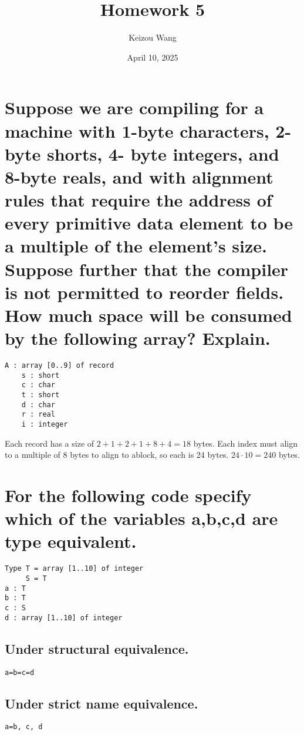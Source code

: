\documentclass[letterpaper]{article}
\title{Homework 5}
\author{Keizou Wang}
\date{April 10, 2025}
\begin{document}
\maketitle

\section{Suppose we are compiling for a machine with 1-byte characters, 2-byte shorts, 4- byte integers, and 8-byte reals, and with alignment rules that require the address of every primitive data element to be a multiple of the element's size. Suppose further that the compiler is not permitted to reorder fields. How much space will be consumed by the following array? Explain.}
\begin{adjustwidth}{2.35em}{0pt}
\begin{Verbatim}[tabsize=4]
A : array [0..9] of record
	s : short
	c : char
	t : short
	d : char
	r : real
	i : integer
\end{Verbatim}
Each record has a size of $2+1+2+1+8+4=18$ bytes. Each index must align to a multiple of 8 bytes to align to ablock, so each is 24 bytes. $24\cdot10=240$ bytes.
\end{adjustwidth}

\section{For the following code specify which of the variables a,b,c,d are type equivalent.}
\begin{adjustwidth}{2.35em}{0pt}
\begin{Verbatim}[tabsize=4]
Type T = array [1..10] of integer
     S = T
a : T
b : T
c : S
d : array [1..10] of integer
\end{Verbatim}
\end{adjustwidth}
\subsection{Under structural equivalence.}
\begin{adjustwidth}{2.35em}{0pt}
\begin{Verbatim}[tabsize=4]
a=b=c=d 
\end{Verbatim}
\end{adjustwidth}
\subsection{Under strict name equivalence.}
\begin{adjustwidth}{2.35em}{0pt}
\begin{Verbatim}[tabsize=4]
a=b, c, d
\end{Verbatim}
\end{adjustwidth}
\end{document}
